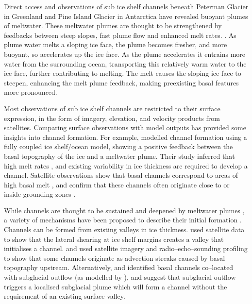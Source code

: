 % 
Direct access and observations of sub ice shelf channels beneath Peterman Glacier in Greenland \citep{rignot2008channelized} and Pine Island Glacier in Antarctica \citep{stanton2013channelized} have revealed buoyant plumes of meltwater. 
These meltwater plumes are thought to be strengthened by feedbacks between steep slopes, fast plume flow and enhanced melt rates. \cite [e.g.][] {jenkins2011convection, sergienko2013basal, gladish2012ice}. As plume water melts a sloping ice face, the plume becomes fresher, and more buoyant, so accelerates up the ice face. As the plume accelerates it entrains more water from the surrounding ocean, transporting this relatively warm water to the ice face, further contributing to melting. The melt causes the sloping ice face to steepen,  enhancing the melt plume feedback, making preexisting basal features more pronounced. 

Most observations of sub ice shelf channels are restricted to their surface expression, in the form of imagery, elevation, and velocity products from satellites. Comparing surface observations with model outputs has provided some insights into channel formation. 
For example, \cite{sergienko2013basal} modelled channel formation using a fully coupled ice shelf/ocean model, showing a positive feedback between the basal topography of the ice and a meltwater plume. Their study inferred that high melt rates
, and existing variability in ice thickness are required to develop a channel. Satellite observations show that basal channels correspond to areas of high basal melt \cite [e.g.][]{rignot2008recent}, and confirm that these channels often originate close to or inside grounding zones \citep{alley2016impacts}.

While channels are thought to be sustained and deepened by meltwater plumes \cite [e.g.][] {sergienko2013basal}, a variety of mechanisms have been proposed to describe their initial formation  \cite [e.g.][] {alley2019troughs}. 
Channels can be formed from existing valleys in ice thickness. \cite{alley2019troughs} used satellite data to show that the lateral shearing at ice shelf margins creates a valley that initialises a channel. \cite{drews2017actively} and \cite{jeofry2018hard} used satellite imagery and radio--echo--sounding profiling to show that some channels originate as advection streaks caused by basal topography upstream. 
Alternatively, \cite{alley2016impacts} and \cite{le2013evidence} identified basal channels co--located with subglacial outflow (as modelled by \cite{le2013evidence}), and suggest that subglacial outflow triggers a localised subglacial plume which will form a channel without the requirement of an existing surface valley. 


